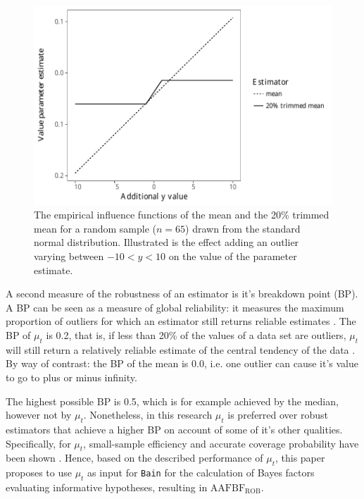 \documentclass[11pt, a4paper]{article}
\begin{document}
\begin{figure}[!t]
\begin{center}

	\begin{minipage}{.5\textheight}
	\includegraphics[scale=0.75]{IFillustration.pdf}
	\caption{The empirical influence functions of the mean and the 20\% trimmed 		mean for a random sample ($n=65$) drawn from the standard normal distribution. 
	Illustrated is the effect adding an outlier varying between $ -10 < y < 10 $ 
	on the value of the parameter estimate.}
	\label{fig:IFillustration}
	\end{minipage}

\end{center}
\end{figure}

A second measure of the robustness of an estimator is it's breakdown point (BP). 
A BP can be seen as a measure of global reliability: it measures the maximum proportion of outliers for which an estimator still returns reliable estimates \citep{Ruckstuhl2014}. 
The BP of $\mu_t$ is 0.2, that is, if less than 20\% of the values of a data set are outliers, $\mu_t$ will still return a relatively reliable estimate of the central tendency of the data \citep[p.39]{Wilcox2017}. 
By way of contrast: the BP of the mean is 0.0, i.e. one outlier can cause it's value to go to plus or minus infinity. 

The highest possible BP is 0.5, which is for example achieved by the median, however not by $\mu_t$. 
Nonetheless, in this research $\mu_t$ is preferred over robust estimators that achieve a higher BP on account of some of it's other qualities. 
Specifically, for $\mu_t$, small-sample efficiency and accurate coverage probability have been shown \citep[pp.~90-93]{Wilcox2017}.
Hence, based on the described performance of $\mu_t$, this paper proposes to use $\mu_t$ as input for \texttt{Bain} for the calculation of Bayes factors evaluating informative hypotheses, resulting in $\mathrm{AAFBF_{ROB}}$.  
\end{document}
